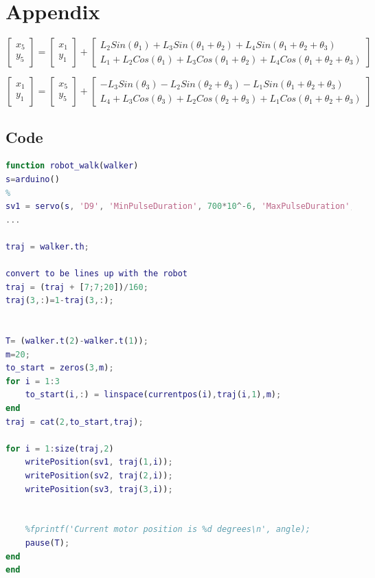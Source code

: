 \documentclass[twoside,twocolumn]{article}
\begin{document}
\onecolumn
\section{Appendix}
\begin{equation}
\begin{bmatrix}
x_5 \\
y_5
\end{bmatrix}
=
\begin{bmatrix}
x_1 \\
y_1
\end{bmatrix}
+
\begin{bmatrix}
L_2Sin(\theta_1)+L_3Sin(\theta_1+\theta_2)+L_4Sin(\theta_1+\theta_2+\theta_3) \\
L_1 + L_2Cos(\theta_1)+L_3Cos(\theta_1+\theta_2)+L_4Cos(\theta_1+\theta_2+\theta_3)
\end{bmatrix}
\label{eq:fk}
\end{equation}  

\begin{equation}
\begin{bmatrix}
x_1 \\
y_1
\end{bmatrix}
=
\begin{bmatrix}
x_5 \\
y_5
\end{bmatrix}
+
\begin{bmatrix}
-L_3Sin(\theta_3)-L_2Sin(\theta_2+\theta_3)-L_1Sin(\theta_1+\theta_2+\theta_3) \\
L_4 + L_3Cos(\theta_3)+L_2Cos(\theta_2+\theta_3)+L_1Cos(\theta_1+\theta_2+\theta_3)
\end{bmatrix}
\label{eq:fk2}
\end{equation} 

\begingroup
\let\clearpage\relax 
\twocolumn 
\endgroup
\subsection{Code}

\begin{lstlisting}[language=matlab]
function robot_walk(walker)
s=arduino()
% 
sv1 = servo(s, 'D9', 'MinPulseDuration', 700*10^-6, 'MaxPulseDuration', 2300*10^-6);
...

traj = walker.th;

convert to be lines up with the robot
traj = (traj + [7;7;20])/160;
traj(3,:)=1-traj(3,:);


T= (walker.t(2)-walker.t(1));
m=20;
to_start = zeros(3,m);
for i = 1:3
    to_start(i,:) = linspace(currentpos(i),traj(i,1),m);
end    
traj = cat(2,to_start,traj);

for i = 1:size(traj,2)
    writePosition(sv1, traj(1,i));
    writePosition(sv2, traj(2,i));
    writePosition(sv3, traj(3,i));

    
    %fprintf('Current motor position is %d degrees\n', angle);
    pause(T);
end
end
\end{lstlisting}
\newpage
\vphantom{500mm}
\vspace{25mm}
\end{document}
